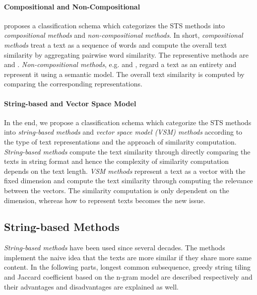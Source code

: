 \paragraph{Compositional and Non-Compositional}

\cite{bar2013composite} proposes a classification schema which categorizes the STS methods into \textit{compositional methods} and \textit{non-compositional methods}. In short, \textit{compositional methods} treat a text as a sequence of words and compute the overall text similarity by aggregating pairwise word similarity. The representive methods are \citet{islam2008semantic} and \citet{tsatsaronis2010text}. \textit{Non-compositional methods}, e.g. \citet{gabrilovich2007computing} and \citet{kennedy2008evaluating}, regard a text as an entirety and represent it using a semantic model. The overall text similarity is computed by comparing the corresponding representations. 

\paragraph{String-based and Vector Space Model}

In the end, we propose a classification schema which categorize the STS methods into \textit{string-based methods} and \textit{vector space model (VSM) methods} according to the type of text representations and the approach of similarity computation. \textit{String-based methods} compute the text similarity through directly comparing the texts in string format and hence the complexity of similarity computation depends on the text length. \textit{VSM methods} represent a text as a vector with the fixed dimension and compute the text similarity through computing the relevance between the vectors. The similarity computation is only dependent on the dimension, whereas how to represent texts becomes the new issue. 
\bigbreak
\subsection{String-based Methods}
\label{sec:2.2}


\textit{String-based methods} have been used since several decades. The methods implement the naive idea that the texts are more similar if they share more same content. In the following parts, longest common subsequence, greedy string tiling and Jaccard coefficient based on the n-gram model are described respectively and their advantages and disadvantages are explained as well. 


